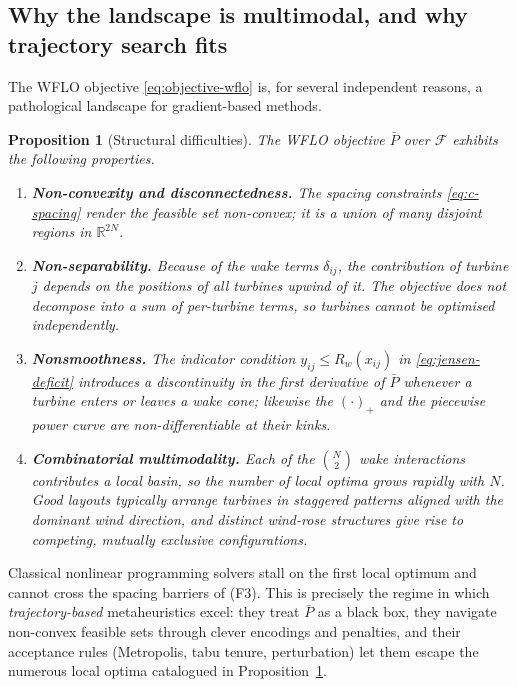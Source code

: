 \documentclass[11pt,a4paper]{article}
\newtheorem{proposition}{Proposition}
\newcommand{\R}{\mathbb{R}}
\begin{document}
\subsection{Why the landscape is multimodal, and why trajectory search fits}

The WFLO objective \eqref{eq:objective-wflo} is, for several independent
reasons, a pathological landscape for gradient-based methods.

\begin{proposition}[Structural difficulties]
\label{prop:wflo-hard}
The WFLO objective $\bar{P}$ over $\mathcal{F}$ exhibits the following
properties.
\begin{enumerate}
  \item \textbf{Non-convexity and disconnectedness.} The spacing constraints
        \eqref{eq:c-spacing} render the feasible set non-convex; it is a union
        of many disjoint regions in $\R^{2N}$.
  \item \textbf{Non-separability.} Because of the wake terms $\delta_{ij}$,
        the contribution of turbine $j$ depends on the positions of all
        turbines upwind of it. The objective does not decompose into a sum of
        per-turbine terms, so turbines cannot be optimised independently.
  \item \textbf{Nonsmoothness.} The indicator condition
        $y_{ij}\le R_{w}(x_{ij})$ in \eqref{eq:jensen-deficit} introduces a
        discontinuity in the first derivative of $\bar{P}$ whenever a turbine
        enters or leaves a wake cone; likewise the $(\cdot)_{+}$ and the
        piecewise power curve are non-differentiable at their kinks.
  \item \textbf{Combinatorial multimodality.} Each of the
        $\binom{N}{2}$ wake interactions contributes a local basin, so the
        number of local optima grows rapidly with $N$. Good layouts typically
        arrange turbines in staggered patterns aligned with the dominant wind
        direction, and distinct wind-rose structures give rise to competing,
        mutually exclusive configurations.
\end{enumerate}
\end{proposition}

Classical nonlinear programming solvers stall on the first local optimum and
cannot cross the spacing barriers of (F3). This is precisely the regime in
which \emph{trajectory-based} metaheuristics excel: they treat $\bar{P}$ as a
black box, they navigate non-convex feasible sets through clever encodings and
penalties, and their acceptance rules (Metropolis, tabu tenure, perturbation)
let them escape the numerous local optima catalogued in
Proposition~\ref{prop:wflo-hard}.
\end{document}
